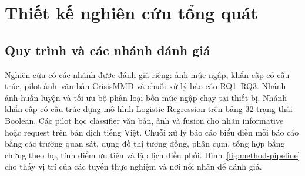 \section{Thiết kế nghiên cứu tổng quát}\label{sec:02-overview}
\subsection{Quy trình và các nhánh đánh giá}
Nghiên cứu có các nhánh được đánh giá riêng: ảnh mức ngập, khẩn cấp có cấu trúc, pilot ảnh--văn bản CrisisMMD và chuỗi xử lý báo cáo RQ1--RQ3. Nhánh ảnh huấn luyện và tối ưu bộ phân loại bốn mức ngập chạy tại thiết bị. Nhánh khẩn cấp có cấu trúc dựng mô hình Logistic Regression trên bảng 32 trạng thái Boolean. Các pilot học classifier văn bản, ảnh và fusion cho nhãn informative hoặc request trên bản dịch tiếng Việt. Chuỗi xử lý báo cáo biểu diễn mỗi báo cáo bằng các trường quan sát, dựng đồ thị tương đồng, phân cụm, tổng hợp bằng chứng theo họ, tính điểm ưu tiên và lập lịch điều phối. Hình~\ref{fig:method-pipeline} cho thấy vị trí của các tuyến thực nghiệm và nơi nối nhãn để đánh giá.

